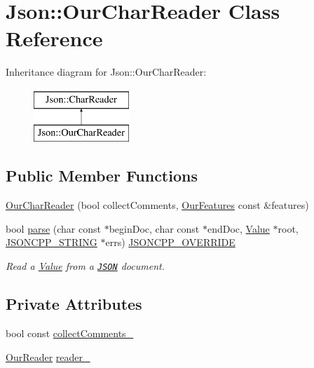 \hypertarget{classJson_1_1OurCharReader}{}\section{Json\+:\+:Our\+Char\+Reader Class Reference}
\label{classJson_1_1OurCharReader}
Inheritance diagram for Json\+:\+:Our\+Char\+Reader\+:\begin{figure}[H]
\begin{center}
\leavevmode
\includegraphics[height=2.000000cm]{classJson_1_1OurCharReader}
\end{center}
\end{figure}
\subsection*{Public Member Functions}
\begin{DoxyCompactItemize}
\item 
\hyperlink{classJson_1_1OurCharReader_a5015506620e7ba7bab417756fa1ca9fe}{Our\+Char\+Reader} (bool collect\+Comments, \hyperlink{classJson_1_1OurFeatures}{Our\+Features} const \&features)
\item 
bool \hyperlink{classJson_1_1OurCharReader_a547f08ec5a9951ca69e8bb2e90296c83}{parse} (char const $\ast$begin\+Doc, char const $\ast$end\+Doc, \hyperlink{classJson_1_1Value}{Value} $\ast$root, \hyperlink{json_8hpp_a1e723f95759de062585bc4a8fd3fa4be}{J\+S\+O\+N\+C\+P\+P\+\_\+\+S\+T\+R\+I\+NG} $\ast$errs) \hyperlink{json_8hpp_a824d6199c91488107e443226fa6022c5}{J\+S\+O\+N\+C\+P\+P\+\_\+\+O\+V\+E\+R\+R\+I\+DE}
\begin{DoxyCompactList}\small\item\em Read a \hyperlink{classJson_1_1Value}{Value} from a \href{http://www.json.org}{\tt J\+S\+ON} document. \end{DoxyCompactList}\end{DoxyCompactItemize}
\subsection*{Private Attributes}
\begin{DoxyCompactItemize}
\item 
bool const \hyperlink{classJson_1_1OurCharReader_aa6afd3d0f754cadad0f6d2be38bcfee0}{collect\+Comments\+\_\+}
\item 
\hyperlink{classJson_1_1OurReader}{Our\+Reader} \hyperlink{classJson_1_1OurCharReader_aedd4520b8570654ed7aa0726075ee58d}{reader\+\_\+}
\end{DoxyCompactItemize}


